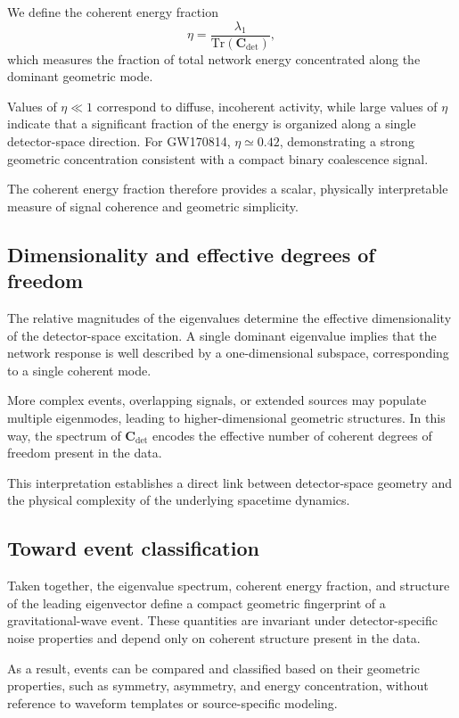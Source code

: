 \documentclass[11pt,a4paper]{article}
\begin{document}
We define the coherent energy fraction
\[
\eta = \frac{\lambda_1}{\mathrm{Tr}(\mathbf{C}_{\mathrm{det}})},
\]
which measures the fraction of total network energy concentrated along the dominant
geometric mode.

Values of $\eta \ll 1$ correspond to diffuse, incoherent activity,
while large values of $\eta$ indicate that a significant fraction of the energy
is organized along a single detector-space direction.
For GW170814, $\eta \simeq 0.42$, demonstrating a strong geometric concentration
consistent with a compact binary coalescence signal.

The coherent energy fraction therefore provides a scalar, physically interpretable
measure of signal coherence and geometric simplicity.

\subsection{Dimensionality and effective degrees of freedom}

The relative magnitudes of the eigenvalues determine the effective dimensionality
of the detector-space excitation.
A single dominant eigenvalue implies that the network response is well described
by a one-dimensional subspace, corresponding to a single coherent mode.

More complex events, overlapping signals, or extended sources may populate
multiple eigenmodes, leading to higher-dimensional geometric structures.
In this way, the spectrum of $\mathbf{C}_{\mathrm{det}}$ encodes the effective number of
coherent degrees of freedom present in the data.

This interpretation establishes a direct link between detector-space geometry
and the physical complexity of the underlying spacetime dynamics.

\subsection{Toward event classification}

Taken together, the eigenvalue spectrum, coherent energy fraction,
and structure of the leading eigenvector define a compact geometric fingerprint
of a gravitational-wave event.
These quantities are invariant under detector-specific noise properties
and depend only on coherent structure present in the data.

As a result, events can be compared and classified based on their geometric properties,
such as symmetry, asymmetry, and energy concentration, without reference to waveform templates
or source-specific modeling.
\end{document}

